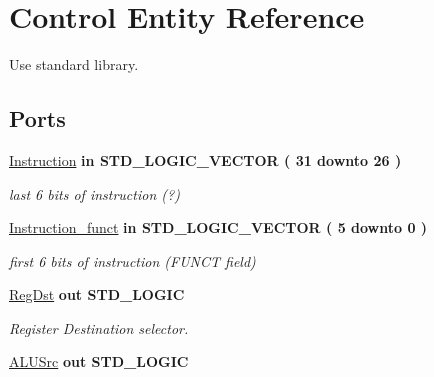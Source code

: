 \hypertarget{class_control}{\section{\-Control \-Entity \-Reference}
\label{class_control}
}


\-Use standard library.  


\*
\*
\subsection*{\-Ports}
 \begin{DoxyCompactItemize}
\item 
\hypertarget{class_control_a35120c002e477a6e77c738ea1aaa5505}{\hyperlink{class_control_a35120c002e477a6e77c738ea1aaa5505}{\-Instruction}  {\bfseries {\bfseries in }} {\bfseries \-S\-T\-D\-\_\-\-L\-O\-G\-I\-C\-\_\-\-V\-E\-C\-T\-O\-R (   31    downto    26  ) } }\label{class_control_a35120c002e477a6e77c738ea1aaa5505}

\begin{DoxyCompactList}\small\item\em last 6 bits of instruction (?) \end{DoxyCompactList}\item 
\hypertarget{class_control_a837426aa7a23a4b3f1534d7a5a47fd84}{\hyperlink{class_control_a837426aa7a23a4b3f1534d7a5a47fd84}{\-Instruction\-\_\-funct}  {\bfseries {\bfseries in }} {\bfseries \-S\-T\-D\-\_\-\-L\-O\-G\-I\-C\-\_\-\-V\-E\-C\-T\-O\-R (   5    downto    0  ) } }\label{class_control_a837426aa7a23a4b3f1534d7a5a47fd84}

\begin{DoxyCompactList}\small\item\em first 6 bits of instruction (\-F\-U\-N\-C\-T field) \end{DoxyCompactList}\item 
\hypertarget{class_control_a3e8450f5ca7972a364f6eaffec9c86a2}{\hyperlink{class_control_a3e8450f5ca7972a364f6eaffec9c86a2}{\-Reg\-Dst}  {\bfseries {\bfseries out }} {\bfseries \-S\-T\-D\-\_\-\-L\-O\-G\-I\-C } }\label{class_control_a3e8450f5ca7972a364f6eaffec9c86a2}

\begin{DoxyCompactList}\small\item\em \-Register \-Destination selector. \end{DoxyCompactList}\item 
\hypertarget{class_control_aec5087b6dc490446af52e39d0264cf50}{\hyperlink{class_control_aec5087b6dc490446af52e39d0264cf50}{\-A\-L\-U\-Src}  {\bfseries {\bfseries out }} {\bfseries \-S\-T\-D\-\_\-\-L\-O\-G\-I\-C } }\label{class_control_aec5087b6dc490446af52e39d0264cf50}


\end{DoxyCompactItemize}
